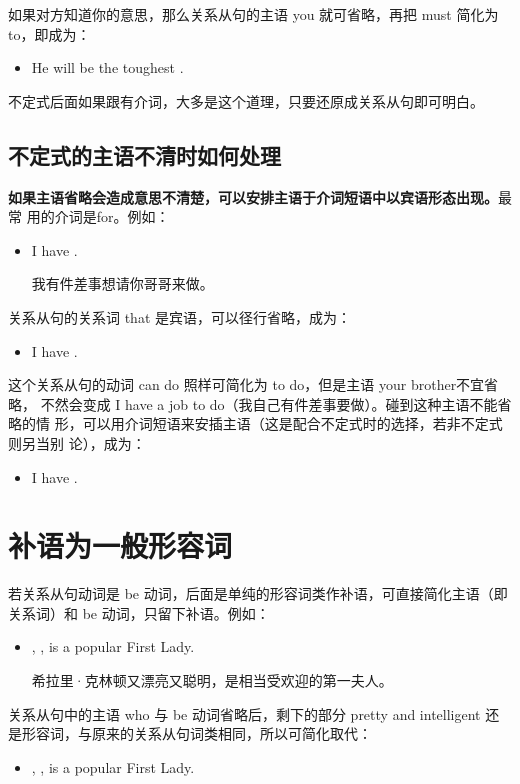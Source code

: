 如果对方知道你的意思，那么关系从句的主语 you 就可省略，再把 must 简化为
to，即成为：
\begin{itemize}
\item He will be the toughest  .
\end{itemize}

不定式后面如果跟有介词，大多是这个道理，只要还原成关系从句即可明白。

\subsection{不定式的主语不清时如何处理}

\textbf{如果主语省略会造成意思不清楚，可以安排主语于介词短语中以宾语形态出现。}最常
用的介词是for。例如：
\begin{itemize}
\item I have  .

  我有件差事想请你哥哥来做。
\end{itemize}
关系从句的关系词 that 是宾语，可以径行省略，成为：
\begin{itemize}
\item I have  .
\end{itemize}
这个关系从句的动词 can do 照样可简化为 to do，但是主语 your brother不宜省略，
不然会变成 I have a job to do（我自己有件差事要做）。碰到这种主语不能省略的情
形，可以用介词短语来安插主语（这是配合不定式时的选择，若非不定式则另当别
论），成为：
\begin{itemize}
\item I have  .
\end{itemize}

\section{补语为一般形容词}

若关系从句动词是 be
动词，后面是单纯的形容词类作补语，可直接简化主语（即关系词）和 be
动词，只留下补语。例如：

\begin{itemize}
\item {}, , is a popular First Lady.

  希拉里·克林顿又漂亮又聪明，是相当受欢迎的第一夫人。
\end{itemize}
关系从句中的主语 who 与 be 动词省略后，剩下的部分 pretty and intelligent
还是形容词，与原来的关系从句词类相同，所以可简化取代：
\begin{itemize}
\item {}, , is a popular First Lady.
\end{itemize}

